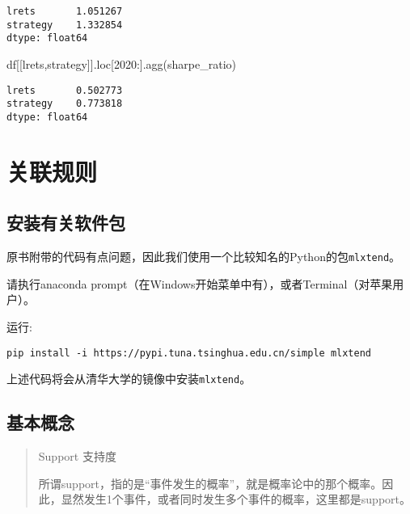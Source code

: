 \documentclass[
  letterpaper,
  DIV=11,
  numbers=noendperiod]{scrreprt}
\newenvironment{Shaded}{\begin{snugshade}}{\end{snugshade}}
\newcommand{\NormalTok}[1]{\textcolor[rgb]{0.00,0.23,0.31}{#1}}
\newcommand{\StringTok}[1]{\textcolor[rgb]{0.13,0.47,0.30}{#1}}
\begin{document}
\begin{verbatim}
lrets       1.051267
strategy    1.332854
dtype: float64
\end{verbatim}

\begin{Shaded}
\begin{Highlighting}[]
\NormalTok{df[[}\StringTok{\textquotesingle{}lrets\textquotesingle{}}\NormalTok{,}\StringTok{\textquotesingle{}strategy\textquotesingle{}}\NormalTok{]].loc[}\StringTok{\textquotesingle{}2020\textquotesingle{}}\NormalTok{:].agg(sharpe\_ratio)}
\end{Highlighting}
\end{Shaded}

\begin{verbatim}
lrets       0.502773
strategy    0.773818
dtype: float64
\end{verbatim}

\hypertarget{ux5173ux8054ux89c4ux5219}{%
\chapter{关联规则}\label{ux5173ux8054ux89c4ux5219}}

\hypertarget{ux5b89ux88c5ux6709ux5173ux8f6fux4ef6ux5305}{%
\section{安装有关软件包}\label{ux5b89ux88c5ux6709ux5173ux8f6fux4ef6ux5305}}

原书附带的代码有点问题，因此我们使用一个比较知名的Python的包\texttt{mlxtend}。

请执行anaconda
prompt（在Windows开始菜单中有），或者Terminal（对苹果用户）。

运行:

\begin{verbatim}
pip install -i https://pypi.tuna.tsinghua.edu.cn/simple mlxtend
\end{verbatim}

上述代码将会从清华大学的镜像中安装\texttt{mlxtend}。

\hypertarget{ux57faux672cux6982ux5ff5}{%
\section{基本概念}\label{ux57faux672cux6982ux5ff5}}

\begin{quote}
Support 支持度

所谓support，指的是``事件发生的概率''，就是概率论中的那个概率。因此，显然发生1个事件，或者同时发生多个事件的概率，这里都是support。
\end{quote}
\end{document}
